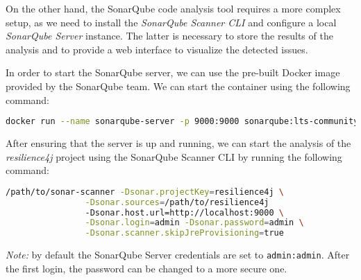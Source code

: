 On the other hand, the SonarQube code analysis tool requires a more complex setup, as we need to install the \textit{SonarQube Scanner CLI} and configure a local \textit{SonarQube Server} instance. The latter is necessary to store the results of the analysis and to provide a web interface to visualize the detected issues.

In order to start the SonarQube server, we can use the pre-built Docker image provided by the SonarQube team. We can start the container using the following command:

\begin{lstlisting}[language=bash, caption={Starting the SonarQube server}]
docker run --name sonarqube-server -p 9000:9000 sonarqube:lts-community
\end{lstlisting}

\noindent After ensuring that the server is up and running, we can start the analysis of the \textit{resilience4j} project using the SonarQube Scanner CLI by running the following command:

\begin{lstlisting}[language=bash, caption={Command to run SonarQube analysis}]
              /path/to/sonar-scanner -Dsonar.projectKey=resilience4j \
                -Dsonar.sources=/path/to/resilience4j 
                -Dsonar.host.url=http://localhost:9000 \
                -Dsonar.login=admin -Dsonar.password=admin \
                -Dsonar.scanner.skipJreProvisioning=true
\end{lstlisting}

\noindent \textit{Note:} by default the SonarQube Server credentials are set to \texttt{admin:admin}. After the first login, the password can be changed to a more secure one.

